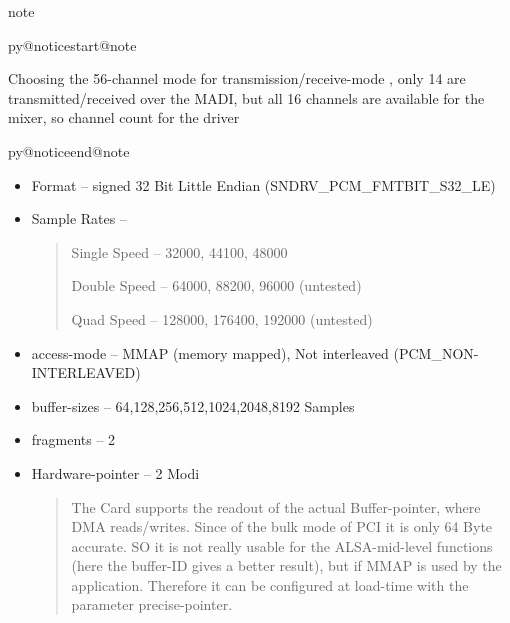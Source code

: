 \documentclass[a4paper,8pt,english]{sphinxmanual}
\makeatletter
\renewenvironment{notice}[2]{%
          \def\py@noticetype{#1}
          \begin{coloredbox}{#1}
          \bf\it
          \par\strong{#2}
          \csname py@noticestart@#1\endcsname
        }
	{
          \csname py@noticeend@\py@noticetype\endcsname
          \end{coloredbox}
        }
\makeatother
\begin{document}
\begin{notice}{note}{Note:}
Choosing the 56-channel mode for
transmission/receive-mode , only 14 are transmitted/received
over the MADI, but all 16 channels are available for the mixer,
so channel count for the driver
\end{notice}
\begin{itemize}
\item {} 
Format -- signed 32 Bit Little Endian (SNDRV\_PCM\_FMTBIT\_S32\_LE)

\item {} 
Sample Rates --
\begin{quote}

Single Speed -- 32000, 44100, 48000

Double Speed -- 64000, 88200, 96000 (untested)

Quad Speed -- 128000, 176400, 192000 (untested)
\end{quote}

\item {} 
access-mode -- MMAP (memory mapped), Not interleaved (PCM\_NON-INTERLEAVED)

\item {} 
buffer-sizes -- 64,128,256,512,1024,2048,8192 Samples

\item {} 
fragments -- 2

\item {} 
Hardware-pointer -- 2 Modi
\begin{quote}

The Card supports the readout of the actual Buffer-pointer,
where DMA reads/writes. Since of the bulk mode of PCI it is only
64 Byte accurate. SO it is not really usable for the
ALSA-mid-level functions (here the buffer-ID gives a better
result), but if MMAP is used by the application. Therefore it
can be configured at load-time with the parameter
precise-pointer.
\end{quote}

\end{itemize}
\end{document}
